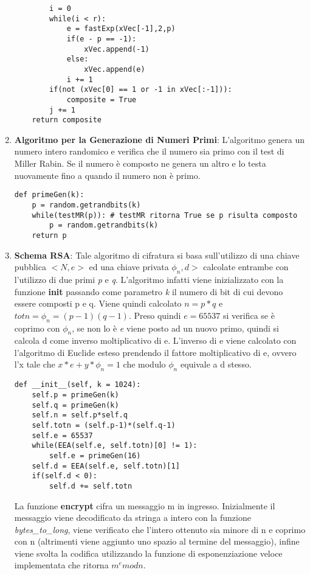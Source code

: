 \documentclass{article}
\begin{document}
\begin{enumerate}
\begin{lstlisting}
        i = 0
        while(i < r):
            e = fastExp(xVec[-1],2,p)
            if(e - p == -1):
                xVec.append(-1)
            else:
                xVec.append(e)
            i += 1
        if(not (xVec[0] == 1 or -1 in xVec[:-1])): 
            composite = True
        j += 1
    return composite
    \end{lstlisting}
    \item \textbf{Algoritmo per la Generazione di Numeri Primi}: L'algoritmo genera un numero intero randomico e verifica che il numero sia primo con il test di Miller Rabin. Se il numero è composto ne genera un altro e lo testa nuovamente fino a quando il numero non è primo.
    \begin{lstlisting}
def primeGen(k):
    p = random.getrandbits(k)
    while(testMR(p)): # testMR ritorna True se p risulta composto
        p = random.getrandbits(k)
    return p
    \end{lstlisting}
    \item \textbf{Schema RSA}: Tale algoritmo di cifratura si basa sull'utilizzo di una chiave pubblica $<N,e>$ ed una chiave privata $\phi_n,d>$ calcolate entrambe con l'utilizzo di due primi \textit{p} e \textit{q}. L'algoritmo infatti viene inizializzato con la funzione \textbf{init} passando come parametro \textit{k} il numero di bit di cui devono essere composti p e q. Viene quindi calcolato $n = p*q$ e $totn = \phi_n = (p-1)(q-1)$. Preso quindi $e = 65537$ si verifica se è coprimo con $\phi_n$, se non lo è \textit{e} viene posto ad un nuovo primo, quindi si calcola d come inverso moltiplicativo di e. L'inverso di e viene calcolato con l'algoritmo di Euclide esteso prendendo il fattore moltiplicativo di e, ovvero l'x tale che $x*e + y*\phi_n = 1$ che modulo $\phi_n$ equivale a d stesso.
    \begin{lstlisting}
def __init__(self, k = 1024):
    self.p = primeGen(k)
    self.q = primeGen(k)
    self.n = self.p*self.q
    self.totn = (self.p-1)*(self.q-1)
    self.e = 65537
    while(EEA(self.e, self.totn)[0] != 1):
        self.e = primeGen(16)
    self.d = EEA(self.e, self.totn)[1]
    if(self.d < 0):
        self.d += self.totn
    \end{lstlisting}
    La funzione \textbf{encrypt} cifra un messaggio m in ingresso. Inizialmente il messaggio viene decodificato da stringa a intero con la funzione \textit{bytes\_to\_long}, viene verificato che l'intero ottenuto sia minore di n e coprimo con n (altrimenti viene aggiunto uno spazio al termine del messaggio), infine viene svolta la codifica utilizzando la funzione di esponenziazione veloce implementata che ritorna $m^e mod n$.

\end{enumerate}
\end{document}
